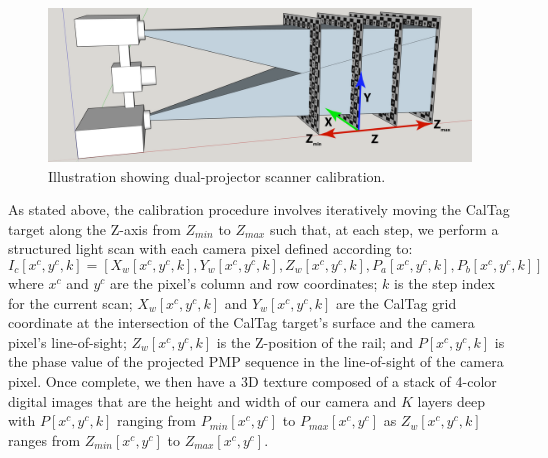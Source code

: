 \documentclass[]{spie}  %
\begin{document}
\begin{figure}[!t]
\centerline{\includegraphics[width=6.6in]{Figures/SLICalibrationDual}}
\vspace{0.1in}
\caption{Illustration showing dual-projector scanner calibration.}
\label{Fig:20}
\end{figure} 

As stated above, the calibration procedure involves iteratively moving the CalTag target along the Z-axis from $Z_{min}$ to $Z_{max}$ such that, at each step, we perform a structured light scan with each camera pixel defined according to:
\begin{equation}
I_c[x^c, y^c, k] = [X_w[x^c, y^c, k], Y_w[x^c, y^c, k], Z_w[x^c, y^c, k], P_a[x^c, y^c, k], P_b[x^c, y^c, k]]
\label{calEqn}
\end{equation}
where $x^c$ and $y^c$ are the pixel’s column and row coordinates; $k$ is the step index for the current scan; $X_w[x^c, y^c, k]$ and $Y_w[x^c, y^c, k]$ are the CalTag grid coordinate at the intersection of the CalTag target’s surface and the camera pixel’s line-of-sight; $Z_w[x^c, y^c, k]$ is the Z-position of the rail; and $P[x^c, y^c, k]$ is the phase value of the projected PMP sequence in the line-of-sight of the camera pixel.  Once complete, we then have a 3D texture composed of a stack of 4-color digital images that are the height and width of our camera and $K$ layers deep with $P[x^c, y^c, k]$ ranging from $P_{min}[x^c, y^c]$ to $P_{max}[x^c, y^c]$ as $Z_w[x^c, y^c, k]$ ranges from $Z_{min}[x^c, y^c]$ to $Z_{max}[x^c, y^c]$.
\end{document}
